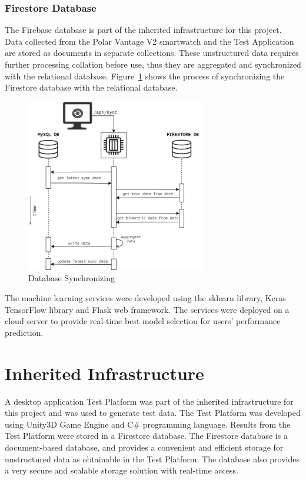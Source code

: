 \subsubsection{Firestore Database}
The Firebase database is part of the inherited infrastructure for this project. Data collected from the Polar Vantage V2 smartwatch and the Test 
Application are stored as documents in separate collections. These unstructured data requires further processing collation before use, thus they 
are aggregated and synchronized with the relational database. Figure~\ref{image:db_sync} shows the process of synchronizing the Firestore database
with the relational database.
\begin{figure}[h!]
    \centering
    \includegraphics[width=0.7\textwidth]{images/db_sync.png}
    \caption{Database Synchronizing}
    \label{image:db_sync}
\end{figure}



The machine learning services were developed using the 
sklearn library, Keras TensorFlow library and Flask web framework. The services were deployed on a cloud server to provide real-time best
model selection for users' performance prediction.

\section{Inherited Infrastructure}

A desktop application Test Platform was part of the inherited infrastructure for this project and was used to generate test data.
The Test Platform was developed using Unity3D Game Engine and C\# programming language. Results from the Test Platform were stored in 
a Firestore database. The Firestore database is a document-based database, and provides a convenient and efficient storage for 
unstructured data as obtainable in the Test Platform. The database also provides a very secure and scalable storage solution with 
real-time access.

